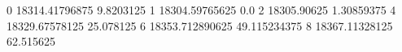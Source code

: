 0 18314.41796875 9.8203125
1 18304.59765625 0.0
2 18305.90625 1.30859375
4 18329.67578125 25.078125
6 18353.712890625 49.115234375
8 18367.11328125 62.515625
